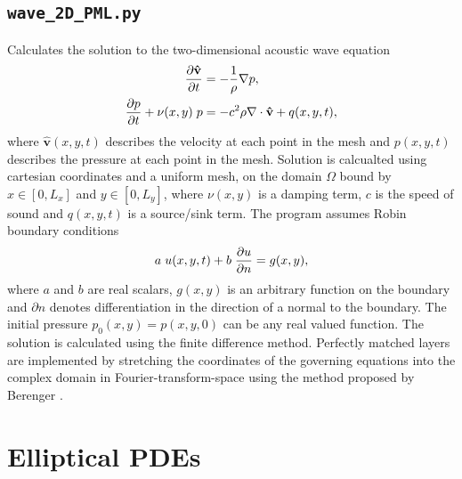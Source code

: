 \documentclass{article}
\begin{document}
\subsection{\texttt{wave\_2D\_PML.py}}
Calculates the solution to the two-dimensional acoustic wave equation
\begin{equation*}
\begin{aligned}
\frac{\partial \mathbf{\hat{v}}}{\partial t} &= - \frac{1}{\rho} \nabla p,\\
\frac{\partial p}{\partial t} + \nu(x,y) \hspace{0.1cm} p &= -c^2 \rho \nabla \cdot \mathbf{\hat{v}} + q(x,y,t),
\end{aligned}
\end{equation*}
where $\mathbf{\hat{v}}(x,y,t)$ describes the velocity at each point in the mesh and $p(x,y,t)$ describes the pressure at each point in the mesh. Solution is calcualted using cartesian coordinates and a uniform mesh, on the domain $\Omega$ bound by $x \in [0,L_x]$ and $y \in [0,L_y]$, where $\nu(x,y)$ is a damping term, $c$ is the speed of sound and $q(x,y,t)$ is a source/sink term. The program assumes Robin boundary conditions
\begin{equation*}
a \hspace{0.1cm} u(x,y,t) + b \hspace{0.1cm} \frac{\partial u}{\partial n} = g(x,y),
\end{equation*}
where $a$ and $b$ are real scalars, $g(x,y)$ is an arbitrary function on the boundary and $\partial n$ denotes differentiation in the direction of a normal to the boundary. The initial pressure $p_0(x,y)=p(x,y,0)$ can be any real valued function. The solution is calculated using the finite difference method. Perfectly matched layers are implemented by stretching the coordinates of the governing equations into the complex domain in Fourier-transform-space using the method proposed by Berenger \cite{Berenger1994}.


\section{Elliptical PDEs}
\end{document}
